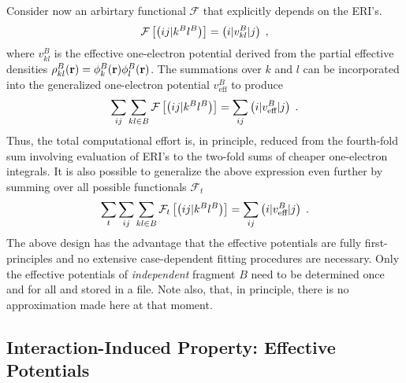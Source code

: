 Consider now an arbirtary functional $\mathcal{F}$ that explicitly depends on the 
ERI's. 
%
 \begin{equation}
 \mathcal{F}
 \left[ 
   \left(i j \vert k^B l^B \right)
	 \right] = \left(i \lvert v_{kl}^B \rvert j \right)  \;,
 \end{equation}
%
where 
$v_{kl}^B$ is the effective one-electron potential derived from the partial
effective densities $\rho_{kl}^B({\bf r}) = \phi_k^B({\bf r})\phi_l^B({\bf r})$.
The summations over $k$ and $l$ can be incorporated into the generalized one-electron potential
$v_{\text{eff}}^B$
to produce
%
\begin{equation}
	\sum_{ij}\sum_{kl\in B} \mathcal{F}\left[ 
   \left(i j \vert k^B l^B \right)
 \right] = \sum_{ij} \left(i \lvert v_{\text{eff}}^B \rvert j \right)  \;.
\end{equation}
%
Thus, the total computational effort is, in principle, reduced from the fourth-fold
sum involving evaluation of ERI's to the two-fold sums of cheaper one-electron integrals.
It is also possible to generalize the above expression even further by
summing over all possible functionals ${\mathcal{F}}_t$
%
\begin{equation} \label{e:ft-reduction}
	\sum_t \sum_{ij}\sum_{kl\in B} {\mathcal{F}}_t\left[ 
   \left(i j \vert k^B l^B \right)
 \right] = \sum_{ij} \left(i \lvert v_{\text{eff}}^B \rvert j \right) \;.
\end{equation}
%
The above design has the advantage that the effective potentials are fully first-principles
and no extensive case-dependent fitting procedures are necessary.
Only the effective potentials of \emph{independent} fragment $B$ need to be determined once and for all
and stored in a file. Note also, that, in principle, there is no approximation 
made here at that moment.

\subsection{\label{ss:2.4}Interaction-Induced Property: Effective Potentials}

